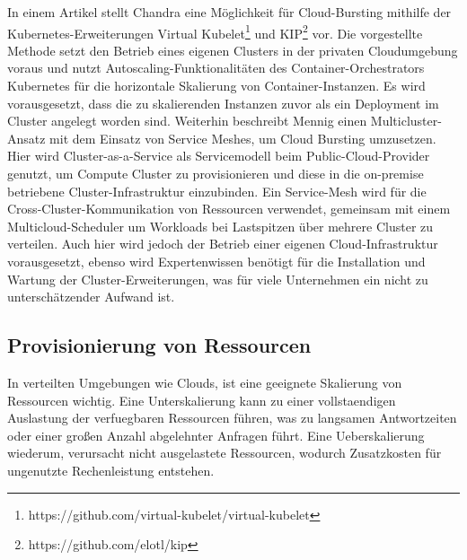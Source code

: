 \documentclass[runningheads]{llncs}
\begin{document}
In einem Artikel stellt Chandra \cite{chandra_cloud_2020} eine Möglichkeit für Cloud-Bursting mithilfe der Kubernetes-Erweiterungen Virtual Kubelet\footnote{https://github.com/virtual-kubelet/virtual-kubelet} und KIP\footnote{https://github.com/elotl/kip} vor. Die vorgestellte Methode setzt den Betrieb eines eigenen Clusters in der privaten Cloudumgebung voraus und nutzt Autoscaling-Funktionalitäten des Container-Orchestrators Kubernetes für die horizontale Skalierung von Container-Instanzen. Es wird vorausgesetzt, dass die zu skalierenden Instanzen zuvor als ein Deployment im Cluster angelegt worden sind. Weiterhin beschreibt Mennig \cite{mennig_cloud_2020} einen Multicluster-Ansatz mit dem Einsatz von Service Meshes, um Cloud Bursting umzusetzen. Hier wird Cluster-as-a-Service als Servicemodell beim Public-Cloud-Provider genutzt, um Compute Cluster zu provisionieren und diese in die on-premise betriebene Cluster-Infrastruktur einzubinden. Ein Service-Mesh wird für die Cross-Cluster-Kommunikation von Ressourcen verwendet, gemeinsam mit einem Multicloud-Scheduler um Workloads bei Lastspitzen über mehrere Cluster zu verteilen. Auch hier wird jedoch der Betrieb einer eigenen Cloud-Infrastruktur vorausgesetzt, ebenso wird Expertenwissen benötigt für die Installation und Wartung der Cluster-Erweiterungen, was für viele Unternehmen ein nicht zu unterschätzender Aufwand ist.
	
\subsection{Provisionierung von Ressourcen}

In verteilten Umgebungen wie Clouds, ist eine geeignete Skalierung von Ressourcen wichtig. Eine Unterskalierung kann zu einer vollstaendigen Auslastung der verfuegbaren Ressourcen führen, was zu langsamen Antwortzeiten oder einer großen Anzahl abgelehnter Anfragen führt.  Eine Ueberskalierung wiederum, verursacht nicht ausgelastete Ressourcen, wodurch Zusatzkosten für ungenutzte Rechenleistung entstehen. \\
\end{document}
